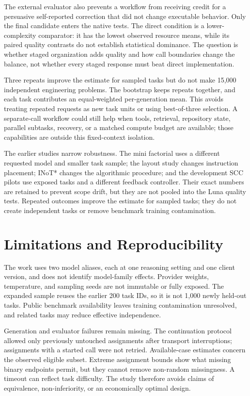 The external evaluator also prevents a workflow from receiving credit for a persuasive self-reported correction that did not change executable behavior. Only the final candidate enters the native tests. The direct condition is a lower-complexity comparator: it has the lowest observed resource means, while its paired quality contrasts do not establish statistical dominance. The question is whether staged organization adds quality and how call boundaries change the balance, not whether every staged response must beat direct implementation.

Three repeats improve the estimate for sampled tasks but do not make 15,000 independent engineering problems. The bootstrap keeps repeats together, and each task contributes an equal-weighted per-generation mean. This avoids treating repeated requests as new task units or using best-of-three selection. A separate-call workflow could still help when tools, retrieval, repository state, parallel subtasks, recovery, or a matched compute budget are available; those capabilities are outside this fixed-context isolation.

The earlier studies narrow robustness. The mini factorial uses a different requested model and smaller task sample; the layout study changes instruction placement; INoT* changes the algorithmic procedure; and the development SCC pilots use exposed tasks and a different feedback controller. Their exact numbers are retained to prevent scope drift, but they are not pooled into the Luna quality tests. Repeated outcomes improve the estimate for sampled tasks; they do not create independent tasks or remove benchmark training contamination.

\section{Limitations and Reproducibility}
The work uses two model aliases, each at one reasoning setting and one client version, and does not identify model-family effects. Provider weights, temperature, and sampling seeds are not immutable or fully exposed. The expanded sample reuses the earlier 200 task IDs, so it is not 1,000 newly held-out tasks. Public benchmark availability leaves training contamination unresolved, and related tasks may reduce effective independence.

Generation and evaluator failures remain missing. The continuation protocol allowed only previously untouched assignments after transport interruptions; assignments with a started call were not retried. Available-case estimates concern the observed eligible subset. Extreme assignment bounds show what missing binary endpoints permit, but they cannot remove non-random missingness. A timeout can reflect task difficulty. The study therefore avoids claims of equivalence, non-inferiority, or an economically optimal design.

